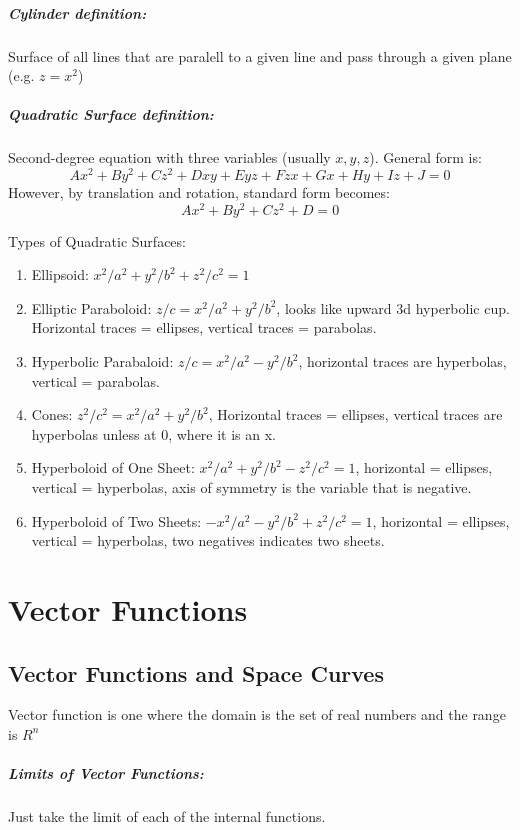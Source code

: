 \documentclass[a4paper,12pt]{report}
\begin{document}
\paragraph{Cylinder definition: } Surface of all lines that are paralell to a given line and pass through a given plane (e.g. $z = x^2$)

\paragraph{Quadratic Surface definition: } Second-degree equation with three variables (usually $x, y, z$). General form is:
$$Ax^2 + By^2 + Cz^2 + Dxy + Eyz + Fzx + Gx + Hy + Iz + J = 0 $$
However, by translation and rotation, standard form becomes:
$$Ax^2 + By^2 + Cz^2 + D = 0$$

Types of Quadratic Surfaces:
\begin{enumerate}
\item Ellipsoid: $x^2/a^2 + y^2/b^2 + z^2/c^2 = 1$ 
\item Elliptic Paraboloid: $z/c = x^2/a^2 + y^2/b^2$, looks like upward 3d hyperbolic cup. Horizontal traces = ellipses, vertical traces = parabolas. 
\item Hyperbolic Parabaloid: $z/c = x^2/a^2 - y^2/b^2$, horizontal traces are hyperbolas, vertical = parabolas. 
\item Cones: $z^2/c^2 = x^2/a^2 + y^2/b^2$, Horizontal traces = ellipses, vertical traces are hyperbolas unless at 0, where it is an x.
\item Hyperboloid of One Sheet: $x^2/a^2 + y^2/b^2 - z^2/c^2 = 1$, horizontal = ellipses, vertical = hyperbolas, axis of symmetry is the variable that is negative. 
\item Hyperboloid of Two Sheets: $-x^2/a^2 - y^2/b^2 + z^2/c^2 = 1$, horizontal = ellipses, vertical = hyperbolas, two negatives indicates two sheets.
\end{enumerate}

\chapter{Vector Functions}
\section{Vector Functions and Space Curves}
Vector function is one where the domain is the set of real numbers and the range is $R^n$

\paragraph{Limits of Vector Functions: } Just take the limit of each of the internal functions.
\end{document}
